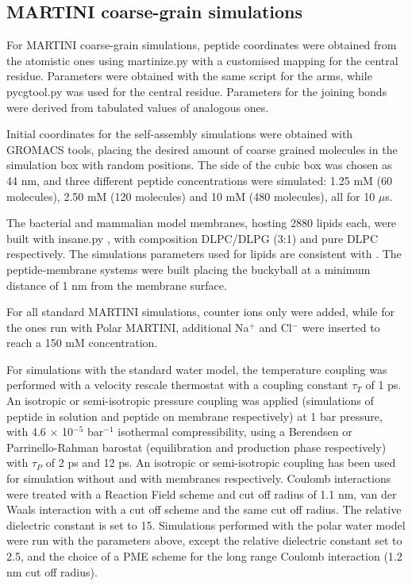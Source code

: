 \subsection{MARTINI coarse-grain simulations} \label{sec:MARTINI_sim_det}
For MARTINI \citep{Marrink2007, Monticelli2008} coarse-grain simulations, peptide coordinates were obtained from the atomistic ones using martinize.py \citep{DeJong2013} with a customised mapping for the central residue. Parameters were obtained with the same script for the arms, while pycgtool.py \citep{Graham2017} was used for the central residue. Parameters for the joining bonds were derived from tabulated values of analogous ones.

Initial coordinates for the self-assembly simulations were obtained with GROMACS tools, placing the desired amount of coarse grained molecules in the simulation box with random positions.
%
The side of the cubic box was chosen as 44 nm, and three different peptide concentrations were simulated: 1.25 mM (60 molecules), 2.50 mM (120 molecules) and 10 mM (480 molecules), all for 10 $\mu$s.

The bacterial and mammalian model membranes, hosting 2880 lipids each, were built with insane.py \citep{Wassenaar2015}, with composition DLPC/DLPG (3:1) and pure DLPC respectively. The simulations parameters used for lipids are consistent with \citet{SiewertJ.Marrink2003}. The peptide-membrane systems were built placing the buckyball at a minimum distance of 1 nm from the membrane surface.

For all standard MARTINI simulations, counter ions only were added, while for the ones run with Polar MARTINI, additional Na$^+$ and Cl$^-$ were inserted to reach a 150 mM concentration.

For simulations with the standard water model, the temperature coupling was performed with a velocity rescale thermostat \citep{Bussi2007} with a coupling constant $\tau _T$ of 1 ps. An isotropic or semi-isotropic pressure coupling was applied (simulations of peptide in solution and peptide on membrane respectively) at 1 bar pressure, with 4.6 $\times$ 10$^{-5}$ bar$^{-1}$ isothermal compressibility, using a Berendsen \citep{Berendsen1984} or Parrinello-Rahman barostat \citep{Parrinello1981} (equilibration and production phase respectively) with $\tau _P$ of 2 ps and 12 ps. An isotropic or semi-isotropic coupling has been used for simulation without and with membranes respectively.
%
Coulomb interactions were treated with a Reaction Field scheme \citep{Tironi1995} and cut off radius of 1.1 nm, van der Waals interaction with a cut off scheme and the same cut off radius. The relative dielectric constant is set to 15.
%
Simulations performed with the polar water model were run with the parameters above, except the relative dielectric constant set to 2.5, and the choice of a PME scheme for the long range Coulomb interaction (1.2 nm cut off radius).

